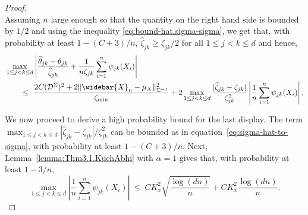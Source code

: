 \documentclass{article}
\begin{document}
\begin{appendices}
\begin{proof}
\begin{equation}
 
 
 \end{equation}
  Assuming $n$ large enough so that the quantity on the right hand side is bounded by $1/2$ and using the inequality \eqref{eq:bound-hat.sigma-sigma}, we get that, with probability at least $1 - (C + 3)/n$, $\widehat{\zeta}_{jk} \ge \zeta_{jk}/2$ for all $1\le j < k\le d$ and hence,
 \begin{align*}
 &\max_{1\le j < k\le d}\left|\frac{\widehat{\theta}_{jk} - \theta_{jk}}{\widehat{\zeta}_{jk}} + \frac{1}{n\zeta_{jk}}\sum_{i=1}^n \psi_{jk}(X_i)\right|\\ 
 &\qquad\le~ \frac{2C(\mathcal{D}^{\Sigma})^2 + 2\|\widebar{X}_n - \mu_X\|_{\Sigma^{-1}}^2}{\zeta_{\min}}
 
 
 + 2\max_{1\le j < k\le d}\frac{|\widehat{\zeta}_{jk} - \zeta_{jk}|}{\zeta_{jk}^2}\left|\frac{1}{n}\sum_{i=1}^n \psi_{jk}(X_i)\right|. 
 \end{align*}
 
 
 We now proceed to derive a high probability bound for the last display. The term $\max_{1\le j < k\le d}{|\widehat{\zeta}_{jk} - \zeta_{jk}|}/{\zeta_{jk}^2}$ can be bounded as in equation~\eqref{eq:sigma-hat-to-sigma}, with probability at least  $1 - (C+3)/n$. Next, Lemma~\ref{lemma:Thm3.1.KuchAbhi} with $\alpha=1$ gives that, with probability at least $1 - 3/n$,
 \begin{equation}\label{eq:bound-on-sum-psi}
 \max_{1\le j < k\le d}\left|\frac{1}{n}\sum_{i=1}^n \psi_{jk}(X_i)\right| ~\le~ CK_x^2\sqrt{\frac{\log(dn)}{n}} + CK_x^2\frac{\log(dn)}{n}.
 \end{equation}
 
 
 
 
 
 
 
 
 
 
 
 
 
 
 
 
 
 
 
 
 
 
 
 
 
 
 
 
 
 
 
 
 
 
 
 
 
 
 
 
 
 
 

\end{proof}
\end{appendices}
\end{document}
